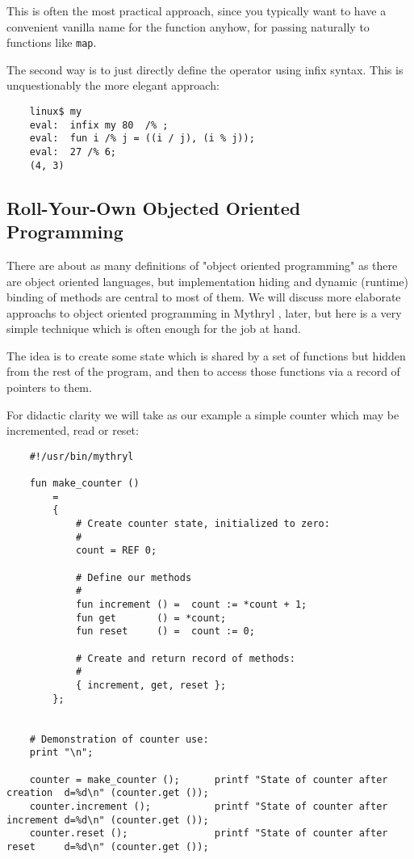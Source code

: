 This is often the most practical approach, since you typically want 
to have a convenient vanilla name for the function anyhow, for 
passing naturally to functions like {\tt map}.

The second way is to just directly define the operator 
using infix syntax.  This is unquestionably the more elegant approach:

\begin{verbatim}
    linux$ my
    eval:  infix my 80  /% ;
    eval:  fun i /% j = ((i / j), (i % j));
    eval:  27 /% 6;
    (4, 3)
\end{verbatim}


\cutend*


\subsection{Roll-Your-Own Objected Oriented Programming}
\label{section:tut:delving-deeper:roll-your-own-oop}

There are about as many definitions of "object oriented programming" as there 
are object oriented languages, but implementation hiding and dynamic (runtime) 
binding of methods are central to most of them.  We will discuss more elaborate 
approachs to object oriented programming in Mythryl 
, 
later, but here is a very simple technique which is often enough for the job at hand. 

The idea is to create some state which is shared by a set of functions but 
hidden from the rest of the program, and then to access those functions via 
a record of pointers to them.

For didactic clarity we will take as our example a simple counter which may 
be incremented, read or reset:

\begin{verbatim}
    #!/usr/bin/mythryl

    fun make_counter ()
        =
        {
            # Create counter state, initialized to zero:
            #
            count = REF 0;

            # Define our methods
            #
            fun increment () =  count := *count + 1;
            fun get       () = *count;
            fun reset     () =  count := 0;

            # Create and return record of methods:
            #
            { increment, get, reset };
        };


    # Demonstration of counter use:
    print "\n";

    counter = make_counter ();      printf "State of counter after creation  d=%d\n" (counter.get ());
    counter.increment ();           printf "State of counter after increment d=%d\n" (counter.get ());
    counter.reset ();               printf "State of counter after reset     d=%d\n" (counter.get ());
\end{verbatim}

